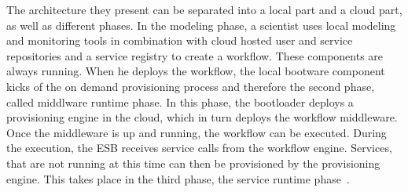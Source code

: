The architecture they present can be separated into a local part and a cloud part, as well as different phases. In the modeling phase, a scientist uses local modeling and monitoring tools in combination with cloud hosted user and service repositories and a service registry to create a workflow. These components are always running. When he deploys the workflow, the local bootware component kicks of the on demand provisioning process and therefore the second phase, called middlware runtime phase. In this phase, the bootloader deploys a provisioning engine in the cloud, which in turn deploys the workflow middleware. Once the middleware is up and running, the workflow can be executed. During the execution, the ESB receives service calls from the workflow engine. Services, that are not running at this time can then be provisioned by the provisioning engine. This takes place in the third phase, the service runtime phase~\autocite{provisioning:ondemand}.
